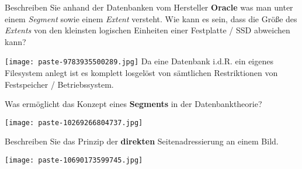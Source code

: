 \documentclass{article}
\begin{document}
\begin{tcolorbox}[colback=white!10!white,colframe=lightgray!75!black,
  savelowerto=\jobname_ex.tex,breakable,enhanced,lines before break=40]

\begin{center}
 Beschreiben Sie anhand der Datenbanken vom Hersteller 
\textbf{Oracle
}was man unter einem 
\textit{Segment 
}sowie einem 
\textit{Extent 
}versteht. Wie kann es sein, dass die Größe des 
\textit{Extents 
}von den kleinsten logischen Einheiten einer Festplatte / SSD abweichen kann? 

\end{center}

\tcblower

\justifying
\texttt{[image: paste-9783935500289.jpg]}
Da eine Datenbank i.d.R. ein eigenes Filesystem anlegt ist es komplett losgelöst von sämtlichen Restriktionen von Festspeicher / Betriebssystem.

\end{tcolorbox}
\begin{tcolorbox}[colback=white!10!white,colframe=lightgray!75!black,
  savelowerto=\jobname_ex.tex,breakable,enhanced,lines before break=40]

\begin{center}
 Was ermöglicht das Konzept eines 
\textbf{Segments
}in der Datenbanktheorie? 

\end{center}

\tcblower

\justifying
\texttt{[image: paste-10269266804737.jpg]}

\end{tcolorbox}
\begin{tcolorbox}[colback=white!10!white,colframe=lightgray!75!black,
  savelowerto=\jobname_ex.tex,breakable,enhanced,lines before break=40]

\begin{center}
 Beschreiben Sie das Prinzip der 
\textbf{direkten
}Seitenadressierung an einem Bild. 

\end{center}

\tcblower

\justifying
\texttt{[image: paste-10690173599745.jpg]}

\end{tcolorbox}
\end{document}
